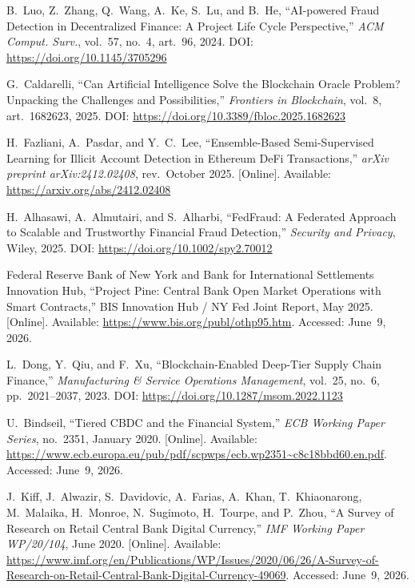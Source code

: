 \documentclass[12pt, a4paper]{report}
\begin{document}
{\begin{enumerate}[label={[\arabic*]}]
\item B.~Luo, Z.~Zhang, Q.~Wang, A.~Ke, S.~Lu, and B.~He, ``AI-powered Fraud Detection in Decentralized Finance: A Project Life Cycle Perspective,'' \textit{ACM Comput. Surv.}, vol.~57, no.~4, art.~96, 2024. DOI: \url{https://doi.org/10.1145/3705296}

\item G.~Caldarelli, ``Can Artificial Intelligence Solve the Blockchain Oracle Problem? Unpacking the Challenges and Possibilities,'' \textit{Frontiers in Blockchain}, vol.~8, art.~1682623, 2025. DOI: \url{https://doi.org/10.3389/fbloc.2025.1682623}

\item H.~Fazliani, A.~Pasdar, and Y.~C.~Lee, ``Ensemble-Based Semi-Supervised Learning for Illicit Account Detection in Ethereum DeFi Transactions,'' \textit{arXiv preprint arXiv:2412.02408}, rev.~October 2025. [Online]. Available: \url{https://arxiv.org/abs/2412.02408}

\item H.~Alhasawi, A.~Almutairi, and S.~Alharbi, ``FedFraud: A Federated Approach to Scalable and Trustworthy Financial Fraud Detection,'' \textit{Security and Privacy}, Wiley, 2025. DOI: \url{https://doi.org/10.1002/spy2.70012}

\item Federal Reserve Bank of New York and Bank for International Settlements Innovation Hub, ``Project Pine: Central Bank Open Market Operations with Smart Contracts,'' BIS Innovation Hub / NY Fed Joint Report, May 2025. [Online]. Available: \url{https://www.bis.org/publ/othp95.htm}. Accessed: June~9, 2026.

\item L.~Dong, Y.~Qiu, and F.~Xu, ``Blockchain-Enabled Deep-Tier Supply Chain Finance,'' \textit{Manufacturing \& Service Operations Management}, vol.~25, no.~6, pp.~2021--2037, 2023. DOI: \url{https://doi.org/10.1287/msom.2022.1123}

\item U.~Bindseil, ``Tiered CBDC and the Financial System,'' \textit{ECB Working Paper Series}, no.~2351, January 2020. [Online]. Available: \url{https://www.ecb.europa.eu/pub/pdf/scpwps/ecb.wp2351~c8c18bbd60.en.pdf}. Accessed: June~9, 2026.

\item J.~Kiff, J.~Alwazir, S.~Davidovic, A.~Farias, A.~Khan, T.~Khiaonarong, M.~Malaika, H.~Monroe, N.~Sugimoto, H.~Tourpe, and P.~Zhou, ``A Survey of Research on Retail Central Bank Digital Currency,'' \textit{IMF Working Paper WP/20/104}, June 2020. [Online]. Available: \url{https://www.imf.org/en/Publications/WP/Issues/2020/06/26/A-Survey-of-Research-on-Retail-Central-Bank-Digital-Currency-49069}. Accessed: June~9, 2026.


\end{enumerate}}
\end{document}
